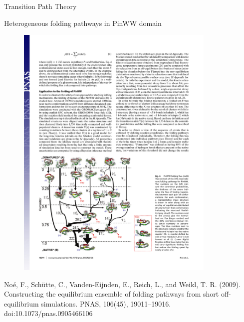 \documentclass{beamer}
\begin{document}
\begin{frame}{Transition Path Theory}

Heterogeneous folding pathways in PinWW domain
\begin{figure}
\includegraphics[width=0.85\textwidth]{TPT-wwdomain}
\end{figure}

\tiny
No\'{e}, F., Sch\"{u}tte, C., Vanden-Eijnden, E., Reich, L., and  Weikl, T. R. (2009). Constructing the equilibrium ensemble of folding pathways from short off-equilibrium simulations. PNAS, 106(45), 19011–19016. doi:10.1073/pnas.0905466106
\normalsize

\end{frame}
\end{document}

